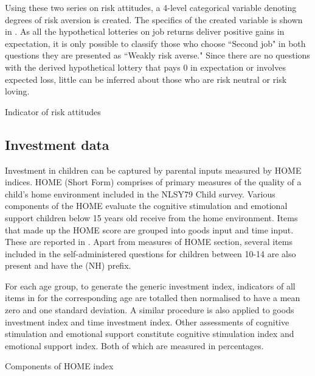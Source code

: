 \documentclass[]{article}
\begin{document}
Using these two series on risk attitudes, a 4-level categorical variable denoting degrees of risk aversion is created. The specifics of the created variable is shown in . As all the hypothetical lotteries on job returns deliver positive gains in expectation, it is only possible to classify those who choose ``Second job" in both questions they are presented as ``Weakly risk averse." Since there are no questions with the derived hypothetical lottery that pays 0 in expectation or involves expected loss, little can be inferred about those who are risk neutral or risk loving. 

\begin{table}[!h]
	\centering
	\setlength{\extrarowheight}{0.2em}
	\caption{Indicator of risk attitudes}	
	
	\label{table:1}
\end{table}



\subsection{Investment data}
Investment in children can be captured by parental inputs measured by HOME indices. HOME (Short Form) comprises of primary measures of the quality of a child's home environment included in the NLSY79 Child survey. Various components of the HOME evaluate the cognitive stimulation and emotional support children below 15 years old receive from the home environment. Items that made up the HOME score are grouped into goods input and time input. These are reported in . Apart from measures of HOME section, several items included in the self-administered questions for children between 10-14 are also present and have the (NH) prefix.  

For each age group, to generate the generic investment index, indicators of all items in  for the corresponding age are totalled then normalised to have a mean zero and one standard deviation. A similar procedure is also applied to goods investment index and time investment index. Other assessments of cognitive stimulation and emotional support constitute cognitive stimulation index and emotional support index. Both of which are measured in percentages.

\begin{table}
	\centering
	\setlength{\extrarowheight}{0.2em}
	\caption{Components of HOME index}	
	
	\label{table:2}
\end{table}  
\end{document}
